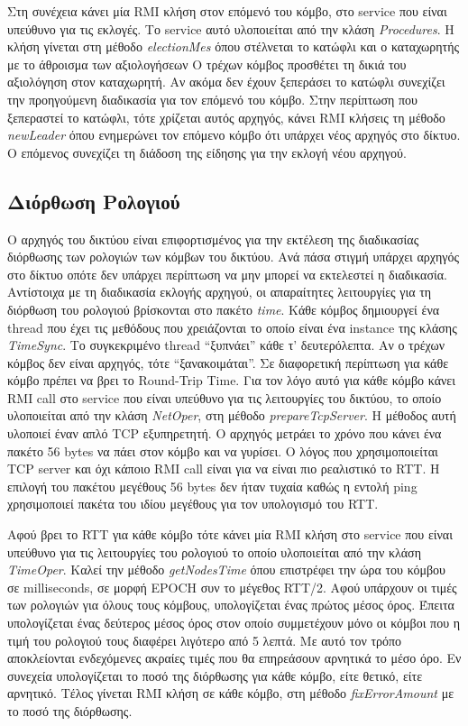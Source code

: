 \documentclass{article}
\begin{document}
Στη συνέχεια κάνει μία RMI κλήση στον επόμενό του κόμβο, στο service που είναι
υπεύθυνο για τις εκλογές. Το service αυτό υλοποιείται από την κλάση
\emph{Procedures}. Η κλήση γίνεται στη μέθοδο \emph{electionMes} όπου στέλνεται
το κατώφλι και ο καταχωρητής με το άθροισμα των αξιολογήσεων Ο τρέχων κόμβος
προσθέτει τη δικιά του αξιολόγηση στον καταχωρητή. Αν ακόμα δεν έχουν ξεπεράσει
το κατώφλι συνεχίζει την προηγούμενη διαδικασία για τον επόμενό του κόμβο. Στην
περίπτωση που ξεπεραστεί το κατώφλι, τότε χρίζεται αυτός αρχηγός, κάνει RMI
κλήσεις τη μέθοδο \emph{newLeader} όπου ενημερώνει τον επόμενο κόμβο ότι υπάρχει
νέος αρχηγός στο δίκτυο. Ο επόμενος συνεχίζει τη διάδοση της είδησης για την
εκλογή νέου αρχηγού.

\subsection{Διόρθωση Ρολογιού}
Ο αρχηγός του δικτύου είναι επιφορτισμένος για την εκτέλεση της διαδικασίας
διόρθωσης των ρολογιών των κόμβων του δικτύου. Ανά πάσα στιγμή υπάρχει αρχηγός
στο δίκτυο οπότε δεν υπάρχει περίπτωση να μην μπορεί να εκτελεστεί η διαδικασία.
Αντίστοιχα με τη διαδικασία εκλογής αρχηγού, οι απαραίτητες λειτουργίες για τη
διόρθωση του ρολογιού βρίσκονται στο πακέτο \emph{time}. Κάθε κόμβος δημιουργεί
ένα thread που έχει τις μεθόδους που χρειάζονται το οποίο είναι ένα instance της
κλάσης \emph{TimeSync}. Το συγκεκριμένο thread ``ξυπνάει'' κάθε τ' δευτερόλεπτα.
Αν ο τρέχων κόμβος δεν είναι αρχηγός, τότε ``ξανακοιμάται''. Σε διαφορετική
περίπτωση για κάθε κόμβο πρέπει να βρει το Round-Trip Time. Για τον λόγο αυτό
για κάθε κόμβο κάνει RMI call στο service που είναι υπεύθυνο για τις λειτουργίες
του δικτύου, το οποίο υλοποιείται από την κλάση \emph{NetOper}, στη μέθοδο
\emph{prepareTcpServer}. Η μέθοδος αυτή υλοποιεί έναν απλό TCP εξυπηρετητή. Ο
αρχηγός μετράει το χρόνο που κάνει ένα πακέτο 56 bytes να πάει στον κόμβο και να
γυρίσει. Ο λόγος που χρησιμοποιείται TCP server και όχι κάποιο RMI call είναι
για να είναι πιο ρεαλιστικό το RTT. Η επιλογή του πακέτου μεγέθους 56 bytes δεν
ήταν τυχαία καθώς η εντολή ping χρησιμοποιεί πακέτα του ιδίου μεγέθους για τον
υπολογισμό του RTT.

Αφού βρει το RTT για κάθε κόμβο τότε κάνει μία RMI κλήση στο service που είναι
υπεύθυνο για τις λειτουργίες του ρολογιού το οποίο υλοποιείται από την κλάση
\emph{TimeOper}. Καλεί την μέθοδο \emph{getNodesTime} όπου επιστρέφει την ώρα
του κόμβου σε milliseconds, σε μορφή EPOCH συν το μέγεθος RTT/2. Αφού υπάρχουν οι τιμές
των ρολογιών για όλους τους κόμβους, υπολογίζεται ένας πρώτος μέσος όρος. Έπειτα
υπολογίζεται ένας δεύτερος μέσος όρος στον οποίο συμμετέχουν μόνο οι κόμβοι που
η τιμή του ρολογιού τους διαφέρει λιγότερο από 5 λεπτά. Με αυτό τον τρόπο
αποκλείονται ενδεχόμενες ακραίες τιμές που θα επηρεάσουν αρνητικά το μέσο όρο.
Εν συνεχεία υπολογίζεται το ποσό της διόρθωσης για κάθε κόμβο, είτε θετικό, είτε
αρνητικό. Τέλος γίνεται RMI κλήση σε κάθε κόμβο, στη μέθοδο
\emph{fixErrorAmount} με το ποσό της διόρθωσης.
\end{document}
